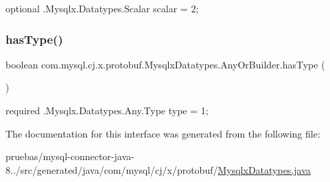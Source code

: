 {\ttfamily optional .Mysqlx.\+Datatypes.\+Scalar scalar = 2;} \mbox{\label{interfacecom_1_1mysql_1_1cj_1_1x_1_1protobuf_1_1_mysqlx_datatypes_1_1_any_or_builder_a432d597e73938ff5d3153af19dec1512}} 
\subsubsection{\texorpdfstring{has\+Type()}{hasType()}}
{\footnotesize\ttfamily boolean com.\+mysql.\+cj.\+x.\+protobuf.\+Mysqlx\+Datatypes.\+Any\+Or\+Builder.\+has\+Type (\begin{DoxyParamCaption}{ }\end{DoxyParamCaption})}

{\ttfamily required .Mysqlx.\+Datatypes.\+Any.\+Type type = 1;} 

The documentation for this interface was generated from the following file\+:\begin{DoxyCompactItemize}
\item 
pruebas/mysql-\/connector-\/java-\/8../src/generated/java/com/mysql/cj/x/protobuf/\mbox{\hyperlink{_mysqlx_datatypes_8java}{Mysqlx\+Datatypes.\+java}}\end{DoxyCompactItemize}
